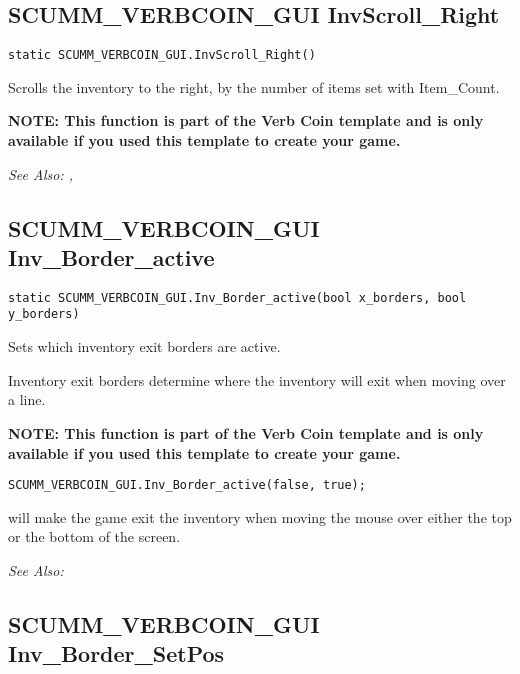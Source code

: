 \subsection{SCUMM_VERBCOIN_GUI InvScroll_Right}\label{SCUMM_VERBCOIN_GUI.InvScroll_Right}%

\begin{verbatim}
static SCUMM_VERBCOIN_GUI.InvScroll_Right()
\end{verbatim}
Scrolls the inventory to the right, by the number of items set with Item_Count.

\bf{NOTE:} This function is part of the Verb Coin template and is only available if
you used this template to create your game.


\it{See Also:} ,


\subsection{SCUMM_VERBCOIN_GUI Inv_Border_active}\label{SCUMM_VERBCOIN_GUI.Inv_Border_active}%

\begin{verbatim}
static SCUMM_VERBCOIN_GUI.Inv_Border_active(bool x_borders, bool y_borders)
\end{verbatim}
Sets which inventory exit borders are active.

Inventory exit borders determine where the inventory will exit when moving over a line.

\bf{NOTE:} This function is part of the Verb Coin template and is only available if
you used this template to create your game.

\begin{verbatim}
SCUMM_VERBCOIN_GUI.Inv_Border_active(false, true);
\end{verbatim}

will make the game exit the inventory when moving the mouse over either the top or the bottom of the screen.

\it{See Also:} 


\subsection{SCUMM_VERBCOIN_GUI Inv_Border_SetPos}\label{SCUMM_VERBCOIN_GUI.Inv_Border_SetPos}%

